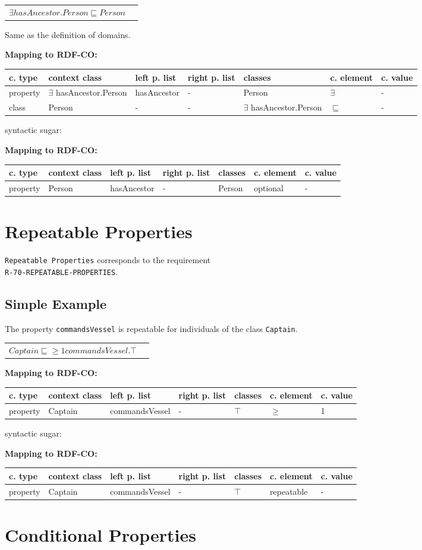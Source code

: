 \documentclass{llncs}
\newcommand{\ms}[1]{\texttt{#1}}
\newenvironment{gcotable}{
  \scriptsize
  \sffamily
  \vspace{0cm}
	\begin{center}
	\textbf{\vspace{0.4cm}Mapping to RDF-CO:} \\
  \begin{tabular}{l|l|l|l|l|l|l}
	\hline
  \textbf{c. type} & \textbf{context class} & \textbf{left p. list} & \textbf{right p. list} & \textbf{classes} & \textbf{c. element} & \textbf{c. value} \\
  \hline

}{
  \hline
  \end{tabular}
	\end{center}
}
\newenvironment{DL}{
  \vspace{0cm}
	\begin{center}
  \begin{tabular}{r l}

}{
  \end{tabular}
	\end{center}
}
\begin{document}
\begin{DL}
$\exists hasAncestor.Person \sqsubseteq Person$ \\
\end{DL}

Same as the definition of domains.

\begin{gcotable}
property & $\exists$ hasAncestor.Person & hasAncestor & - & Person & $\exists$ & - \\
class & Person & - & - & $\exists$ hasAncestor.Person & $\sqsubseteq$ & - \\
\end{gcotable}	

syntactic sugar:

\begin{gcotable}
property & Person & hasAncestor & - & Person & optional & - \\
\end{gcotable}

\section{Repeatable Properties}

\ms{Repeatable Properties} corresponds to the requirement \\
\ms{R-70-REPEATABLE-PROPERTIES}.

\subsection{Simple Example}

The property \ms{commandsVessel} is repeatable for individuals of the class \ms{Captain}.

\begin{DL}
$Captain \sqsubseteq \geq1 commandsVessel.\top $
\end{DL}

\begin{gcotable}
property & Captain & commandsVessel & - & $\top$ & $\geq$ & 1 \\
\end{gcotable}

syntactic sugar:

\begin{gcotable}
property & Captain & commandsVessel & - & $\top$ & repeatable & - \\
\end{gcotable}

\section{Conditional Properties}
\end{document}
